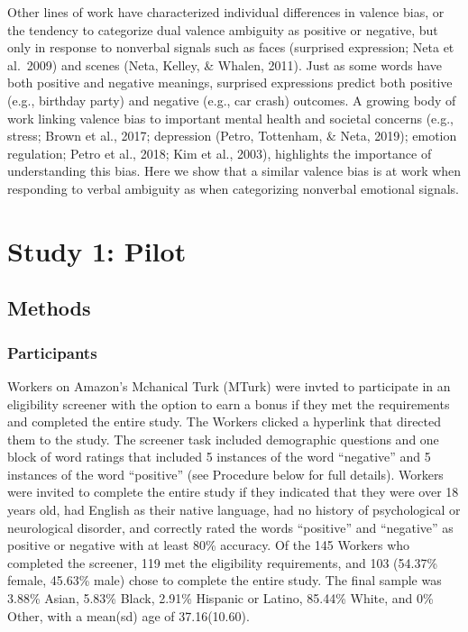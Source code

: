 \documentclass[man]{apa6}
\begin{document}
Other lines of work have characterized individual differences in valence bias, or the tendency to categorize dual valence ambiguity as positive or negative, but only in response to nonverbal signals such as faces (surprised expression; Neta et al.~2009) and scenes (Neta, Kelley, \& Whalen, 2011). Just as some words have both positive and negative meanings, surprised expressions predict both positive (e.g., birthday party) and negative (e.g., car crash) outcomes. A growing body of work linking valence bias to important mental health and societal concerns (e.g., stress; Brown et al., 2017; depression (Petro, Tottenham, \& Neta, 2019); emotion regulation; Petro et al., 2018; Kim et al., 2003), highlights the importance of understanding this bias. Here we show that a similar valence bias is at work when responding to verbal ambiguity as when categorizing nonverbal emotional signals.

\hypertarget{study-1-pilot}{%
\section{Study 1: Pilot}\label{study-1-pilot}}

\hypertarget{methods}{%
\subsection{Methods}\label{methods}}

\hypertarget{participants}{%
\subsubsection{Participants}\label{participants}}

Workers on Amazon's Mchanical Turk (MTurk) were invted to participate in an eligibility screener with the option to earn a bonus if they met the requirements and completed the entire study. The Workers clicked a hyperlink that directed them to the study. The screener task included demographic questions and one block of word ratings that included 5 instances of the word \enquote{negative} and 5 instances of the word \enquote{positive} (see Procedure below for full details). Workers were invited to complete the entire study if they indicated that they were over 18 years old, had English as their native language, had no history of psychological or neurological disorder, and correctly rated the words \enquote{positive} and \enquote{negative} as positive or negative with at least 80\% accuracy. Of the 145 Workers who completed the screener, 119 met the eligibility requirements, and 103 (54.37\% female, 45.63\% male) chose to complete the entire study. The final sample was 3.88\% Asian, 5.83\% Black, 2.91\% Hispanic or Latino, 85.44\% White, and 0\% Other, with a mean(sd) age of 37.16(10.60).
\end{document}
